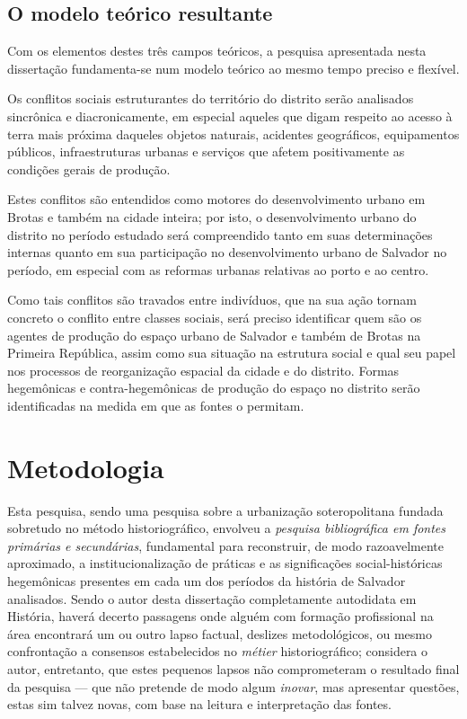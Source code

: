 \subsection[O modelo teórico resultante]{O modelo teórico resultante}
\label{subsec:modteoresult}

Com os elementos destes três campos teóricos, a pesquisa apresentada nesta dissertação fundamenta-se num modelo teórico ao mesmo tempo preciso e flexível. 

Os conflitos sociais estruturantes do território do distrito serão analisados sincrônica e diacronicamente, em especial aqueles que digam respeito ao acesso à terra mais próxima daqueles objetos naturais, acidentes geográficos, equipamentos públicos, infraestruturas urbanas e serviços que afetem positivamente as condições gerais de produção. 

Estes conflitos são entendidos como motores do desenvolvimento urbano em Brotas e também na cidade inteira; por isto, o desenvolvimento urbano do distrito no período estudado será compreendido tanto em suas determinações internas quanto em sua participação no desenvolvimento urbano de Salvador no período, em especial com as reformas urbanas relativas ao porto e ao centro. 

Como tais conflitos são travados entre indivíduos, que na sua ação tornam concreto o conflito entre classes sociais, será preciso identificar quem são os agentes de produção do espaço urbano de Salvador e também de Brotas na Primeira República, assim como sua situação na estrutura social e qual seu papel nos processos de reorganização espacial da cidade e do distrito. Formas hegemônicas e contra-hegemônicas de produção do espaço no distrito serão identificadas na medida em que as fontes o permitam.

\section[Metodologia]{Metodologia}
\label{sec:metodo}

Esta pesquisa, sendo uma pesquisa sobre a urbanização soteropolitana fundada sobretudo no método historiográfico, envolveu a \textit{pesquisa bibliográfica em fontes primárias e secundárias}, fundamental para reconstruir, de modo razoavelmente aproximado, a institucionalização de práticas \cite{BERNARDO1991} e as significações social-históricas \cite{CASTORIADIS1982} hegemônicas presentes em cada um dos períodos da história de Salvador analisados. Sendo o autor desta dissertação completamente autodidata em História, haverá decerto passagens onde alguém com formação profissional na área encontrará um ou outro lapso factual, deslizes metodológicos, ou mesmo confrontação a consensos estabelecidos no \textit{métier} historiográfico; considera o autor, entretanto, que estes pequenos lapsos não comprometeram o resultado final da pesquisa --- que não pretende de modo algum \textit{inovar}, mas apresentar questões, estas sim talvez novas, com base na leitura e interpretação das fontes.

